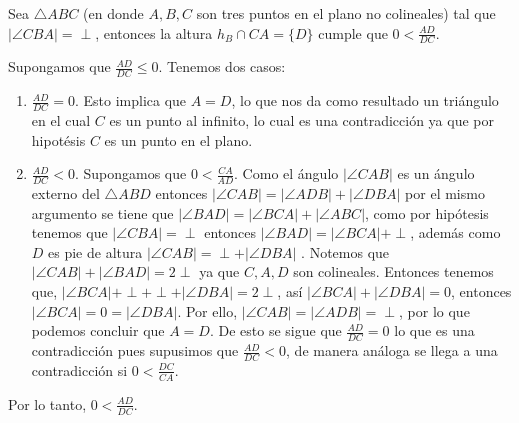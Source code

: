 
\begin{lema}\label{LemaPitágoras}
Sea $\triangle ABC$ (en donde $A, B, C$ son tres puntos en el plano no colineales) tal que $|\angle CBA|=\perp$, entonces la altura $h_{B} \cap CA =\{D\}$ cumple que
$0<\frac{AD}{DC}$.
\end{lema}
\begin{pba}
	
Supongamos que $\frac{AD}{DC}\leqslant 0$. 
Tenemos dos casos:
\begin{enumerate}
\item $\frac{AD}{DC}=0$.
Esto implica que $A=D$, lo que nos da como resultado un triángulo en el cual $C$ es un punto al infinito, lo cual es una contradicción ya que por hipotésis $C$ es un punto en el plano.
\item $\frac{AD}{DC}<0$. 
Supongamos que $0<\frac{CA}{AD}$.
Como el ángulo $|\angle CAB|$ es un ángulo externo del $\triangle ABD$ entonces $|\angle CAB|=|\angle ADB|+|\angle DBA|$ por el mismo argumento se tiene que $|\angle BAD|=|\angle BCA|+|\angle ABC|$, como por hipótesis tenemos que $|\angle CBA|=\perp$ entonces $|\angle BAD|=|\angle BCA|+ \perp $, además como $D$ es pie de altura $|\angle CAB|= \perp+|\angle DBA|$ . Notemos que $|\angle CAB|+|\angle BAD|= 2 \perp$ ya que $C, A, D$ son colineales. Entonces tenemos que, $|\angle BCA|+ \perp+ \perp+|\angle DBA|= 2 \perp $, así $|\angle BCA|+|\angle DBA|=0 $, entonces $|\angle BCA|=0=|\angle DBA|$. Por ello, $|\angle CAB|=|\angle ADB|= \perp$, por lo que podemos concluir que $A=D$. De esto se sigue que $\frac{AD}{DC}=0$ lo que es una contradicción pues supusimos que $\frac{AD}{DC}<0$, de manera análoga se llega a una contradicción si $0<\frac{DC}{CA}$. 
\end{enumerate}
Por lo tanto, $0<\frac{AD}{DC}$.
\end{pba}
	
